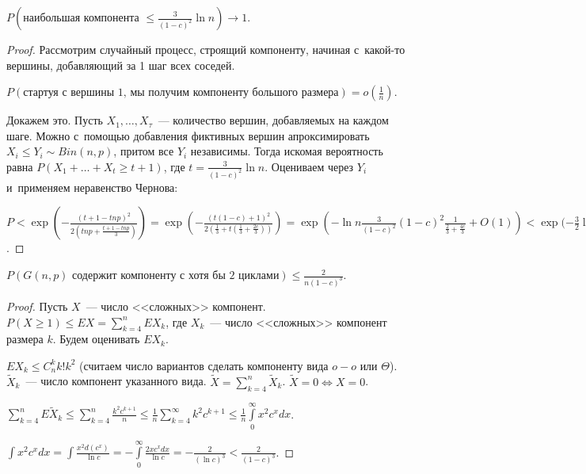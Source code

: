 \documentclass{article}
\begin{document}
\begin{theorem}
	$P(\text{наибольшая компонента } \le \frac{3}{(1 - c)^2} \ln n) \rightarrow 1$.
\end{theorem}
\begin{proof}
	Рассмотрим случайный процесс, строящий компоненту, начиная с~какой-то вершины, добавляющий за 1
	шаг всех соседей.

	$P(\text{стартуя с~вершины 1, мы получим компоненту большого размера}) = o(\frac{1}{n})$.

	Докажем это. Пусть $X_1, \ldots, X_\tau$~--- количество вершин, добавляемых на каждом шаге. Можно
	с~помощью добавления фиктивных вершин апроксимировать $X_i \le Y_i \sim Bin(n, p)$, притом все
	$Y_i$ независимы. Тогда искомая вероятность равна $P(X_1 + \ldots + X_t \ge t + 1)$, где $t =
	\frac{3}{(1 - c)^2} \ln n$. Оцениваем через $Y_i$ и~применяем неравенство Чернова:

	$P < \exp(-\frac{(t+1-tnp)^2}{2(tnp + \frac{t+1-tnp}{3})}) =
	\exp(-\frac{(t(1-c)+1)^2}{2(\frac{1}{3} + t(\frac{1}{3} + \frac{2c}{3}))}) = \exp(-\ln n
	\frac{3}{(1 - c)^2} (1 - c)^2 \frac{1}{\frac{2}{3} + \frac{4c}{3}} + O(1)) < \exp(-\frac{3}{2} \ln
	n + O(1) = O(n^{-1.5}) = o(\frac{1}{n})$.
\end{proof}

\begin{theorem}
	$P(G(n, p) \text{ содержит компоненту с~хотя бы 2 циклами}) \le \frac{2}{n(1-c)^3}$.
\end{theorem}
\begin{proof}
	Пусть $X$~--- число <<сложных>> компонент. $P(X \ge 1) \le EX = \sum\limits_{k=4}^n EX_k$, где
	$X_k$~--- число <<сложных>> компонент размера $k$. Будем оценивать $EX_k$.

	$EX_k \le C_n^k k! k^2$ (считаем число вариантов сделать компоненту вида $o-o$ или $\Theta$).
	$\tilde{X}_k$~--- число компонент указанного вида. $\tilde{X} = \sum\limits_{k=4}^n \tilde{X}_k$.
	$\tilde X = 0 \Leftrightarrow X = 0$.

	$\sum\limits_{k=4}^n E\tilde{X}_k \le \sum\limits_{k=4}^n \frac{k^2 c^{k+1}}{n} \le \frac{1}{n}
	\sum\limits_{k=4}^\infty k^2 c^{k+1}\le \frac{1}{n} \int\limits_0^\infty x^2 c^x dx$.

	$\int x^2 c^x dx = \int \frac{x^2 d(c^x)}{\ln c} = -\int\limits_0^\infty \frac{2xc^x dx}{\ln c} =
	-\frac{2}{(\ln c)^3} < \frac{2}{(1 - c)^3}$.
\end{proof}
\end{document}

